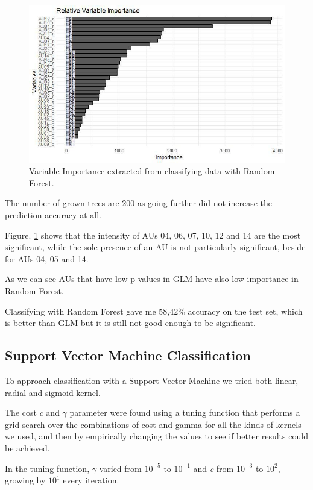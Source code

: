 \begin{figure}[H]
	\centering
	\includegraphics[width=1\textwidth]{images/varimp}
	\caption{Variable Importance extracted from classifying data with Random Forest.}
	\label{fig:varimp}
\end{figure}

The number of grown trees are 200 as going further did not increase the prediction accuracy at all.

Figure. \ref{fig:varimp} shows that the intensity of AUs 04, 06, 07, 10, 12 and 14 are the most significant, while the sole presence of an AU is not particularly significant, beside for AUs 04, 05 and 14.

As we can see AUs that have low p-values in GLM have also low importance in Random Forest.

Classifying with Random Forest gave me 58,42\% accuracy on the test set, which is better than GLM but it is still not good enough to be significant.

\clearpage

\subsection{Support Vector Machine Classification} \label{SVM}
To approach classification with a Support Vector Machine we tried both linear, radial and sigmoid kernel.

The cost $c$ and $\gamma$ parameter were found using a tuning function that performs a grid search over the combinations of cost and gamma for all the kinds of kernels we used, and then by empirically changing the values to see if better results could be achieved. 

In the tuning function, $\gamma$ varied from $10^{-5}$ to $10^{-1}$ and \textit{c} from $10^{-3}$ to $10^2$, growing by $10^1$ every iteration. 

